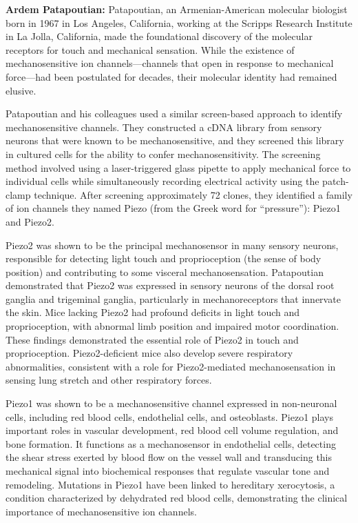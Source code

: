 \textbf{Ardem Patapoutian:} Patapoutian, an Armenian-American molecular biologist born in 1967 in Los Angeles, California, working at the Scripps Research Institute in La Jolla, California, made the foundational discovery of the molecular receptors for touch and mechanical sensation. While the existence of mechanosensitive ion channels---channels that open in response to mechanical force---had been postulated for decades, their molecular identity had remained elusive.

Patapoutian and his colleagues used a similar screen-based approach to identify mechanosensitive channels. They constructed a cDNA library from sensory neurons that were known to be mechanosensitive, and they screened this library in cultured cells for the ability to confer mechanosensitivity. The screening method involved using a laser-triggered glass pipette to apply mechanical force to individual cells while simultaneously recording electrical activity using the patch-clamp technique. After screening approximately 72 clones, they identified a family of ion channels they named Piezo (from the Greek word for ``pressure''): Piezo1 and Piezo2.

Piezo2 was shown to be the principal mechanosensor in many sensory neurons, responsible for detecting light touch and proprioception (the sense of body position) and contributing to some visceral mechanosensation. Patapoutian demonstrated that Piezo2 was expressed in sensory neurons of the dorsal root ganglia and trigeminal ganglia, particularly in mechanoreceptors that innervate the skin. Mice lacking Piezo2 had profound deficits in light touch and proprioception, with abnormal limb position and impaired motor coordination. These findings demonstrated the essential role of Piezo2 in touch and proprioception. Piezo2-deficient mice also develop severe respiratory abnormalities, consistent with a role for Piezo2-mediated mechanosensation in sensing lung stretch and other respiratory forces.

Piezo1 was shown to be a mechanosensitive channel expressed in non-neuronal cells, including red blood cells, endothelial cells, and osteoblasts. Piezo1 plays important roles in vascular development, red blood cell volume regulation, and bone formation. It functions as a mechanosensor in endothelial cells, detecting the shear stress exerted by blood flow on the vessel wall and transducing this mechanical signal into biochemical responses that regulate vascular tone and remodeling. Mutations in Piezo1 have been linked to hereditary xerocytosis, a condition characterized by dehydrated red blood cells, demonstrating the clinical importance of mechanosensitive ion channels.


